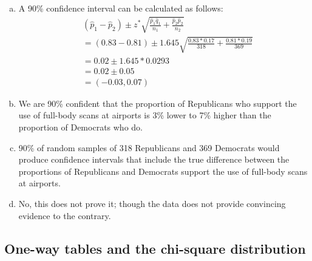 %

{
{
\begin{enumerate}[(a)]
\item A 90\% confidence interval can be calculated as follows:
\begin{align*}
&(\hat{p}_1 - \hat{p}_2) \pm z^* \sqrt{ \frac{\hat{p}_1 \hat{q}_1}{n_1} + \frac{\hat{p}_2 \hat{p}_2}{n_2} } \\
&= (0.83 - 0.81) \pm 1.645 \sqrt{ \frac{0.83 * 0.17}{318} + \frac{0.81 * 0.19}{369} } \\
&= 0.02 \pm 1.645 * 0.0293 \\
&= 0.02 \pm 0.05 \\
&= (-0.03, 0.07)
\end{align*}
\item We are 90\% confident that the proportion of Republicans who support the use of full-body scans at airports is 3\% lower to 7\% higher than the proportion of Democrats who do.
\item 90\% of random samples of 318 Republicans and 369 Democrats would produce confidence intervals that include the true difference between the proportions of Republicans and Democrats support the use of full-body scans at airports.
\item No, this does not prove it; though the data does not provide convincing evidence to the contrary.
\end{enumerate}
}
}

%

\subsection{One-way tables and the chi-square distribution}

